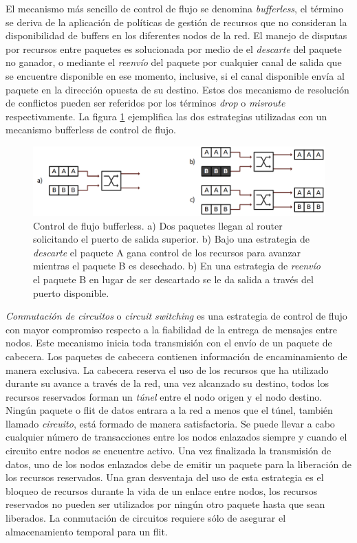 El mecanismo más sencillo de control de flujo se denomina \textit{bufferless}, el término se deriva de la aplicación de políticas de gestión de recursos que no consideran la disponibilidad de buffers en los diferentes nodos de la red. El manejo de disputas por recursos entre paquetes es solucionada por medio de el \textit{descarte} del paquete no ganador, o mediante el \textit{reenvío} del paquete por cualquier canal de salida que se encuentre disponible en ese momento, inclusive, si el canal disponible envía al paquete en la dirección opuesta de su destino. Estos dos mecanismo de resolución de conflictos pueden ser referidos por los términos \textit{drop} o \textit{misroute} respectivamente. La figura \ref{fig:ch1_bufferless} ejemplifica las dos estrategias utilizadas con un mecanismo bufferless de control de flujo.

\begin{figure}
	\includegraphics[width=\linewidth]{figures/ch1_bufferless.png}
	\caption
		{	
			Control de flujo bufferless. a) Dos paquetes llegan al router solicitando el puerto de salida superior. b) Bajo una estrategia de \textit{descarte} el paquete A gana control de los recursos para avanzar mientras el paquete B es desechado. b) En una estrategia de \textit{reenvío} el paquete B en lugar de ser descartado se le da salida a través del puerto disponible.
		}
	\label{fig:ch1_bufferless}
\end{figure}

\textit{Conmutación de circuitos} o \textit{circuit switching} es una estrategia de control de flujo con mayor compromiso respecto a la fiabilidad de la entrega de mensajes entre nodos. Este mecanismo inicia toda transmisión con el envío de un paquete de cabecera. Los paquetes de cabecera contienen información de encaminamiento de manera exclusiva. La cabecera reserva el uso de los recursos que ha utilizado durante su avance a través de la red, una vez alcanzado su destino, todos los recursos reservados forman un \textit{túnel} entre el nodo origen y el nodo destino. Ningún paquete o flit de datos entrara a la red a menos que el túnel, también llamado \textit{circuito}, está formado de manera satisfactoria. Se puede llevar a cabo cualquier número de transacciones entre los nodos enlazados siempre y cuando el circuito entre nodos se encuentre activo. Una vez finalizada la transmisión de datos, uno de los nodos enlazados debe de emitir un paquete para la liberación de los recursos reservados. Una gran desventaja del uso de esta estrategia es el bloqueo de recursos durante la vida de un enlace entre nodos, los recursos reservados no pueden ser utilizados por ningún otro paquete hasta que sean liberados. La conmutación de circuitos requiere sólo de asegurar el almacenamiento temporal para un flit.

